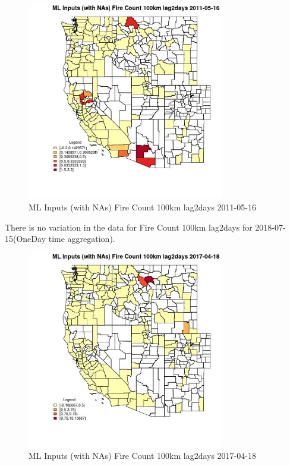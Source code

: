 \begin{figure} 
\centering  
\includegraphics[width=0.77\textwidth]{Code_Outputs/Report_ML_input_PM25_Step4_part_e_de_duplicated_aves_compiled_2019-05-21wNAs_CountyFire_Count_100km_lag2daysMean2011-05-16.jpg} 
\caption{\label{fig:Report_ML_input_PM25_Step4_part_e_de_duplicated_aves_compiled_2019-05-21wNAsCountyFire_Count_100km_lag2daysMean2011-05-16}ML Inputs (with NAs) Fire Count 100km lag2days 2011-05-16} 
\end{figure} 
 

There is no variation in the data for Fire Count 100km lag2days for 2018-07-15(OneDay time aggregation). 
 

\begin{figure} 
\centering  
\includegraphics[width=0.77\textwidth]{Code_Outputs/Report_ML_input_PM25_Step4_part_e_de_duplicated_aves_compiled_2019-05-21wNAs_CountyFire_Count_100km_lag2daysMean2017-04-18.jpg} 
\caption{\label{fig:Report_ML_input_PM25_Step4_part_e_de_duplicated_aves_compiled_2019-05-21wNAsCountyFire_Count_100km_lag2daysMean2017-04-18}ML Inputs (with NAs) Fire Count 100km lag2days 2017-04-18} 
\end{figure} 
 

